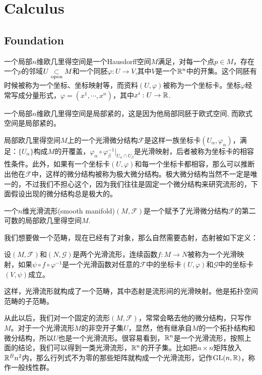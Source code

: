 \chapter{Calculus}
\section{Foundation}

\para 一个局部$n$维欧几里得空间是一个Hausdorff空间$M$满足，对每一个点$p\in M$，存在一个$p$的邻域$U\underset{\mathrm{open}}{\subset} M$和一个同胚$\varphi:U\to V$,其中$V$是一个$\mathbb{R}^n$中的开集。这个同胚有时候被称为一个坐标、坐标映射等，而资料$(U,\varphi)$被称为一个{\kaishu 坐标卡}。坐标$\varphi$经常写成分量形式，$\varphi=(x^1,\cdots,x^n)$，其中$x^i:U\to \mathbb{R}$.

一个局部$n$维欧几里得空间是局部紧的，这是因为他局部同胚于欧式空间, 而欧式空间是局部紧的。

\para 局部欧几里得空间$M$上的一个光滑微分结构$\mathscr{F}$是这样一族坐标卡$(U_\alpha,\varphi_\alpha)$，满足：$\{U_\alpha\}$构成$M$的开覆盖，$\varphi_\alpha\circ\varphi^{-1}_\beta|_{U_\alpha\cap U_\beta}$是光滑映射，后者被称为坐标卡的相容性条件。此外，如果有一个坐标卡$(U,\varphi)$和每一个坐标卡都相容，那么可以推断出他在$\mathscr{F}$中，这样的微分结构被称为极大微分结构。极大微分结构当然不一定是唯一的，不过我们不担心这个，因为我们往往是固定一个微分结构来研究流形的，下面假设出现的微分结构总是极大的。

\para 一个$n$维光滑流形(smooth manifold)$(M,\mathscr{F})$是一个赋予了光滑微分结构$\mathscr{F}$的第二可数的局部欧几里得空间$M$.

我们想要做一个范畴，现在已经有了对象，那么自然需要态射，态射被如下定义：

\para 设$(M,\mathscr{F})$和$(N,\mathscr{G})$是两个光滑流形，连续函数$f:M\to N$被称为一个{\kaishu 光滑映射}，如果$\psi\circ f\circ \varphi^{-1}$是一个光滑函数对任意的$\mathscr{F}$中的坐标卡$(U,\varphi)$和$\mathscr{G}$中的坐标卡$(V,\psi)$成立。

这样，光滑流形就构成了一个范畴，其中态射是流形间的光滑映射。他是拓扑空间范畴的子范畴。

从此以后，我们对一个固定的流形$(M,\mathscr{F})$，常常会略去他的微分结构，只写作$M$。对于一个光滑流形$M$的非空开子集$U$，显然，他有继承自$M$的一个拓扑结构和微分结构，所以$U$也是一个光滑流形。很容易看到，$\mathbb{R}^n$是一个光滑流形，按照上面的结论，我们可以得到一类光滑流形，$\mathbb{R}^n$的开子集。比如把$n\times n$矩阵放入$\mathbb{R}^B{n^2}$内，那么行列式不为零的那些矩阵就构成一个光滑流形，记作$\mathrm{GL}(n,\mathbb{R})$，称作一般线性群。

